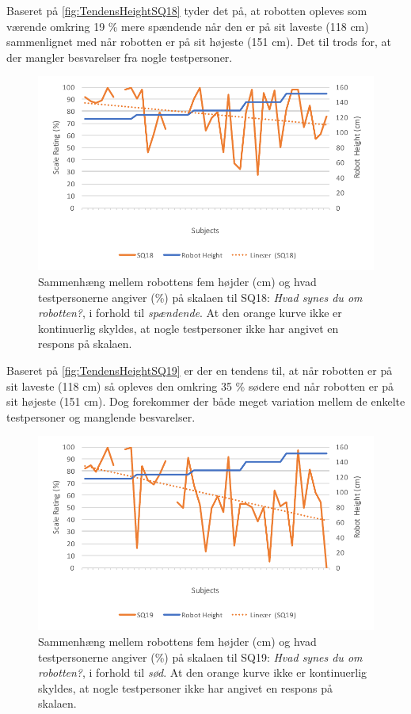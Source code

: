 \noindent
%
Baseret på \autoref{fig:TendensHeightSQ18} tyder det på, at robotten opleves som værende omkring 19 \% mere spændende når den er på sit laveste (118 cm) sammenlignet med når robotten er på sit højeste (151 cm). Det til trods for, at der mangler besvarelser fra nogle testpersoner. 
%
\begin{figure}[H]
\centering
\includegraphics[width=\textwidth]{Figure/DatabehandlingSkalaer/TendensHeight/HeightSQ18}
\caption{Sammenhæng mellem robottens fem højder (cm) og hvad testpersonerne angiver (\%) på skalaen til SQ18: \textit{Hvad synes du om robotten?}, i forhold til \textit{spændende}. At den orange kurve ikke er kontinuerlig skyldes, at nogle testpersoner ikke har angivet en respons på skalaen.}
\label{fig:TendensHeightSQ18}
\end{figure}
\noindent
%
Baseret på \autoref{fig:TendensHeightSQ19} er der en tendens til, at når robotten er på sit laveste (118 cm) så opleves den omkring 35 \% sødere end når robotten er på sit højeste (151 cm). Dog forekommer der både meget variation mellem de enkelte testpersoner og manglende besvarelser. 
%
\begin{figure}[H]
\centering
\includegraphics[width=\textwidth]{Figure/DatabehandlingSkalaer/TendensHeight/HeightSQ19}
\caption{Sammenhæng mellem robottens fem højder (cm) og hvad testpersonerne angiver (\%) på skalaen til SQ19: \textit{Hvad synes du om robotten?}, i forhold til \textit{sød}. At den orange kurve ikke er kontinuerlig skyldes, at nogle testpersoner ikke har angivet en respons på skalaen.}
\label{fig:TendensHeightSQ19}
\end{figure}
